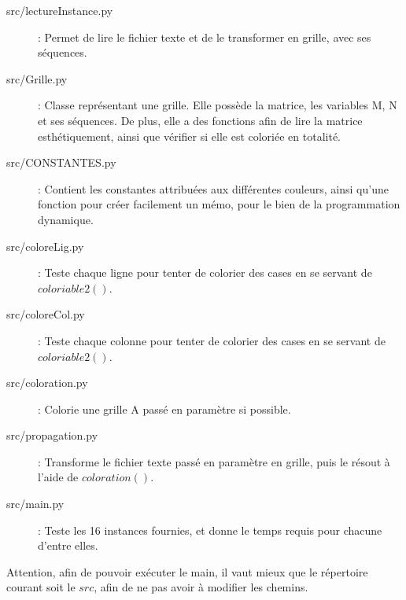\documentclass[a4paper,12pt]{article}
\begin{document}
\begin{description}
	\item[src/lectureInstance.py] : Permet de lire le fichier texte et de le transformer en grille, avec ses séquences.
	\item[src/Grille.py] : Classe représentant une grille. Elle possède la matrice, les variables M, N et ses séquences. De plus, elle a des fonctions afin de lire la matrice esthétiquement, ainsi que vérifier si elle est coloriée en totalité.
	\item[src/CONSTANTES.py] : Contient les constantes attribuées aux différentes couleurs, ainsi qu'une fonction pour créer facilement un mémo, pour le bien de la programmation dynamique.
	\item[src/coloreLig.py] : Teste chaque ligne pour tenter de colorier des cases en se servant de $coloriable2()$.
	\item[src/coloreCol.py] : Teste chaque colonne pour tenter de colorier des cases en se servant de $coloriable2()$.
	\item[src/coloration.py] : Colorie une grille A passé en paramètre si possible.
	\item[src/propagation.py] : Transforme le fichier texte passé en paramètre en grille, puis le résout à l'aide de $coloration()$.
	\item[src/main.py] : Teste les 16 instances fournies, et donne le temps requis pour chacune d'entre elles.
\end{description}

Attention, afin de pouvoir exécuter le main, il vaut mieux que le répertoire courant soit le $src$, afin de ne pas avoir à modifier les chemins.

\newpage
\end{document}
